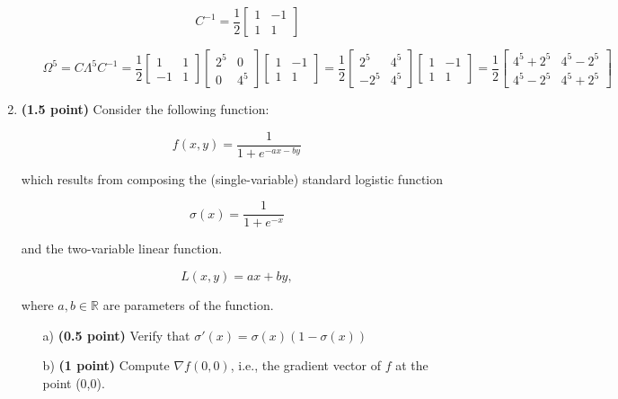 \documentclass[]{book}
\theoremstyle{definition}
\begin{document}
\begin{enumerate}
\begin{itemize}
\[
C^{-1} = \frac{1}{2}\begin{bmatrix}
1 & -1 \\
1 & 1
\end{bmatrix}
\]

\[
\Omega^5 = C \Lambda^5 C^{-1} = \frac{1}{2}
\begin{bmatrix}
1 & 1 \\
-1 & 1
\end{bmatrix}
\begin{bmatrix}
2^5 & 0 \\
0 & 4^5
\end{bmatrix}
\begin{bmatrix}
1 & -1 \\
1 & 1
\end{bmatrix}=\frac{1}{2}
\begin{bmatrix}
2^5 & 4^5 \\
-2^5 & 4^5
\end{bmatrix}
\begin{bmatrix}
1 & -1 \\
1 & 1
\end{bmatrix}=\frac{1}{2}
\begin{bmatrix}
4^5 + 2^5 & 4^5 - 2^5 \\
4^5 - 2^5 & 4^5 + 2^5
\end{bmatrix}
\]


\end{itemize}




\item {\bf (1.5 point)} Consider the following function:

\[
f(x,y) = \frac{1}{1 + e^{-ax-by}}
\]

which results from composing the (single-variable) standard logistic function

\[
\sigma(x) = \frac{1}{1 + e^{-x}}
\]

and the two-variable linear function.

\[
L(x, y) = ax+by,
\]

where $a,b\in\mathbb{R}$ are parameters of the function.

\begin{itemize}
\item[a)] {\bf (0.5 point)} Verify that $\sigma'(x) = \sigma(x)(1-\sigma(x))$
\item[b)] {\bf (1 point)} Compute $\nabla f (0,0)$, i.e., the gradient vector of $f$ at the point (0,0).
\end{itemize}


\end{enumerate}
\end{document}
